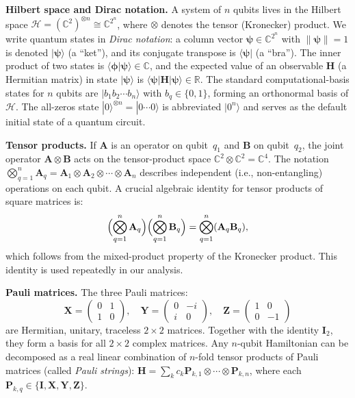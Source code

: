\documentclass[11pt]{article}
\newcommand{\cH}{\mathcal{H}}
\newcommand{\bbR}{\mathbb{R}}
\newcommand{\bbC}{\mathbb{C}}
\theoremstyle{plain}
\theoremstyle{plain}
\begin{document}
\medskip\noindent\textbf{Hilbert space and Dirac notation.}
A system of $n$ qubits lives in the Hilbert space
$\cH=(\bbC^{2})^{\otimes n}\cong\bbC^{2^n}$, where $\otimes$ denotes
the tensor (Kronecker) product.  We write quantum states in
\emph{Dirac notation}: a column vector $\boldsymbol{\psi}\in\bbC^{2^n}$ with
$\|\boldsymbol{\psi}\|=1$ is denoted $|\boldsymbol{\psi}\rangle$ (a ``ket''), and its conjugate
transpose is $\langle\boldsymbol{\psi}|$ (a ``bra'').  The inner product of two
states is $\langle\boldsymbol{\phi}|\boldsymbol{\psi}\rangle\in\bbC$, and the expected value of
an observable $\mathbf{H}$ (a Hermitian matrix) in state $|\boldsymbol{\psi}\rangle$ is
$\langle\boldsymbol{\psi}|\mathbf{H}|\boldsymbol{\psi}\rangle\in\bbR$.
The standard computational-basis states for $n$ qubits are
$|b_1 b_2\cdots b_n\rangle$ with $b_q\in\{0,1\}$, forming an
orthonormal basis of $\cH$.  The all-zeros state
$|0\rangle^{\otimes n}=|0\cdots 0\rangle$ is abbreviated
$|0^n\rangle$ and serves as the default initial state of a quantum
circuit.

\medskip\noindent\textbf{Tensor products.}
If $\mathbf{A}$ is an operator on qubit~$q_1$ and $\mathbf{B}$ on qubit~$q_2$, the
joint operator $\mathbf{A}\otimes \mathbf{B}$ acts on the tensor-product space
$\bbC^2\otimes\bbC^2=\bbC^4$.  The notation
$\bigotimes_{q=1}^n \mathbf{A}_q = \mathbf{A}_1\otimes \mathbf{A}_2\otimes\cdots\otimes \mathbf{A}_n$
describes independent (i.e., non-entangling) operations on each
qubit.  A crucial algebraic identity for tensor products of
square matrices is:
\begin{equation}\label{eq:tensor_mult}
  \Bigl(\bigotimes_{q=1}^n \mathbf{A}_q\Bigr)
  \Bigl(\bigotimes_{q=1}^n \mathbf{B}_q\Bigr)
  = \bigotimes_{q=1}^n (\mathbf{A}_q \mathbf{B}_q),
\end{equation}
which follows from the mixed-product property of the Kronecker
product.  This identity is used repeatedly in our analysis.

\medskip\noindent\textbf{Pauli matrices.}
The three Pauli matrices:
\[
  \mathbf{X}=\begin{pmatrix}0&1\\1&0\end{pmatrix},\quad
  \mathbf{Y}=\begin{pmatrix}0&-i\\i&0\end{pmatrix},\quad
  \mathbf{Z}=\begin{pmatrix}1&0\\0&-1\end{pmatrix}
\]
are Hermitian, unitary, traceless $2\times 2$ matrices.  Together with
the identity $\mathbf{I}_2$, they form a basis for all $2\times 2$ complex
matrices.  Any $n$-qubit Hamiltonian can be decomposed as a real
linear combination of $n$-fold tensor products of Pauli matrices
(called \emph{Pauli strings}):
$\mathbf{H}=\sum_k c_k \mathbf{P}_{k,1}\otimes\cdots\otimes \mathbf{P}_{k,n}$, where each
$\mathbf{P}_{k,q}\in\{\mathbf{I},\mathbf{X},\mathbf{Y},\mathbf{Z}\}$.
\end{document}
